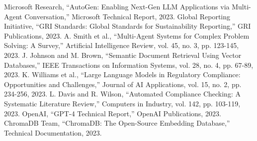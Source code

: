 \documentclass[conference]{IEEEtran}
\begin{document}
\begin{thebibliography}{00}
 Microsoft Research, ``AutoGen: Enabling Next-Gen LLM Applications via Multi-Agent Conversation,'' Microsoft Technical Report, 2023.
 Global Reporting Initiative, ``GRI Standards: Global Standards for Sustainability Reporting,'' GRI Publications, 2023.
 A. Smith et al., ``Multi-Agent Systems for Complex Problem Solving: A Survey,'' Artificial Intelligence Review, vol. 45, no. 3, pp. 123-145, 2023.
 J. Johnson and M. Brown, ``Semantic Document Retrieval Using Vector Databases,'' IEEE Transactions on Information Systems, vol. 28, no. 4, pp. 67-89, 2023.
 K. Williams et al., ``Large Language Models in Regulatory Compliance: Opportunities and Challenges,'' Journal of AI Applications, vol. 15, no. 2, pp. 234-256, 2023.
 L. Davis and R. Wilson, ``Automated Compliance Checking: A Systematic Literature Review,'' Computers in Industry, vol. 142, pp. 103-119, 2023.
 OpenAI, ``GPT-4 Technical Report,'' OpenAI Publications, 2023.
 ChromaDB Team, ``ChromaDB: The Open-Source Embedding Database,'' Technical Documentation, 2023.
\end{thebibliography}
\end{document}
